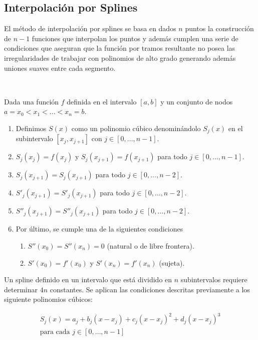 \subsection{Interpolación por Splines}\label{Splines}

El método de interpolación por splines se basa en dados $n$ puntos la
construcción de $n - 1$ funciones que interpolan los puntos y además cumplen
una serie de condiciones que aseguran que la función por tramos resultante no
posea las irregularidades de trabajar con polinomios de alto grado generando
además uniones suaves entre cada segmento.

~

Dada una función $f$ definida en el intervalo $[a, b]$ y un conjunto de nodos $a
= x_0 < x_1 < \dots < x_n = b$.

\begin{enumerate}
	\item Definimos $S(x)$ como un
	polinomio cúbico denominándolo $S_j(x)$ en el subintervalo $[x_j, x_{j+1}]$
	con $j \in [0, \dots, n - 1]$.

	\item $S_j(x_j) = f(x_j)$ y $S_j(x_{j+1}) = f(x_{j+1})$ para todo $j \in [0, \dots, n - 1]$.
	\item $S_j(x_{j+1}) = S_j(x_{j+1})$ para todo $j \in [0, \dots, n - 2]$.
	\item $S'_j(x_{j+1}) = S'_j(x_{j+1})$ para todo $j \in [0, \dots, n - 2]$.
	\item $S''_j(x_{j+1}) = S''_j(x_{j+1})$ para todo $j \in [0, \dots, n - 2]$.
	\item Por último, se cumple una de la siguientes condiciones
		\begin{enumerate}
			\item $S''(x_0) = S''(x_n) = 0$ (natural o de libre
				frontera).\label{splines_item_6b}
			\item $S'(x_0) = f'(x_0)$ y $S'(x_n) = f'(x_n)$ (sujeta).
		\end{enumerate}
\end{enumerate}

Un spline definido en un intervalo que está dividido en $n$ subintervalos
requiere determinar $4n$ constantes. Se aplican las condiciones descritas previamente a los siguiente
polinomios cúbicos:

\begin{gather*}
	S_j(x) = a_j + b_j(x - x_j) + c_j(x - x_j)^2 + d_j(x - x_j)^3 \\
	\text{para cada } j \in [0, \dots, n - 1]
\end{gather*}

